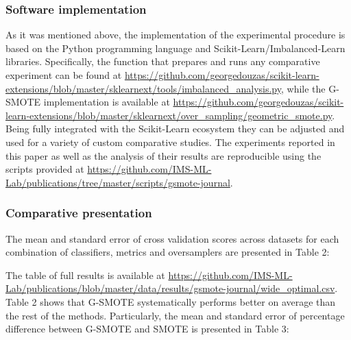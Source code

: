 \documentclass[parskip=full]{scrartcl}
\begin{document}
\subsubsection{Software implementation}

As it was mentioned above, the implementation of the experimental procedure is
based on the Python programming language and Scikit-Learn/Imbalanced-Learn
libraries. Specifically, the function that prepares and runs any comparative
experiment can be found at
\url{https://github.com/georgedouzas/scikit-learn-extensions/blob/master/sklearnext/tools/imbalanced_analysis.py},
while the G-SMOTE implementation is available at
\url{https://github.com/georgedouzas/scikit-learn-extensions/blob/master/sklearnext/over_sampling/geometric_smote.py}.
Being fully integrated with the Scikit-Learn ecosystem they can be adjusted and
used for a variety of custom comparative studies. The experiments reported in
this paper as well as the analysis of their results are reproducible using the
scripts provided at
\url{https://github.com/IMS-ML-Lab/publications/tree/master/scripts/gsmote-journal}.

\subsubsection{Comparative presentation}

The mean and standard error of cross validation scores across datasets for each combination of
classifiers, metrics and oversamplers are presented in Table 2:


The table of full results is available at
\url{https://github.com/IMS-ML-Lab/publications/blob/master/data/results/gsmote-journal/wide_optimal.csv}.
Table 2 shows that G-SMOTE systematically performs better on average than the
rest of the methods. Particularly, the mean and standard error of percentage
difference between G-SMOTE and SMOTE is presented in Table 3:
\end{document}
